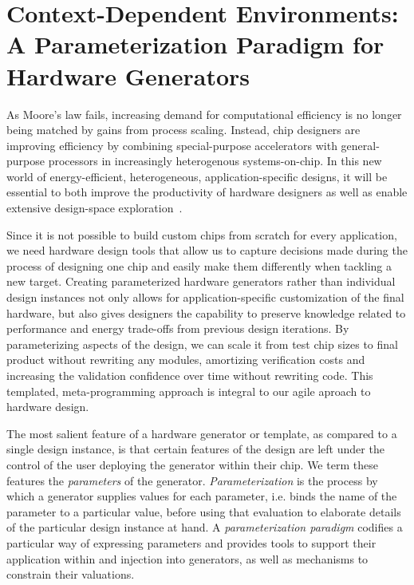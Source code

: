 \chapter{Context-Dependent Environments: \\ A Parameterization Paradigm for Hardware Generators}
\label{c.parameters}

As Moore's law fails, increasing demand for computational efficiency is no longer being matched by gains from process scaling. 
Instead, chip designers are improving efficiency by combining special-purpose accelerators with general-purpose processors in increasingly heterogenous systems-on-chip.
In this new world of energy-efficient, heterogeneous, application-specific designs, it will be essential to both improve the productivity of hardware designers as well as enable extensive design-space exploration~\cite{shacham-micro10}.

Since it is not possible to build custom chips from scratch for every application,
we need hardware design tools that allow us to capture decisions made
during the process of designing one chip and easily make them differently when tackling a new target.
Creating parameterized hardware generators rather than individual design instances not only allows for application-specific customization of the final hardware,
but also gives designers the capability to preserve knowledge related to performance and energy trade-offs from previous design iterations.
By parameterizing aspects of the design, we can scale it from test chip sizes to final product without rewriting any modules, amortizing verification costs and increasing the validation confidence over time without rewriting code.
This templated, meta-programming approach is integral to our agile aproach to hardware design.

The most salient feature of a hardware generator or template, as
compared to a single design instance, is that certain features of the design are
left under the control of the user deploying the generator within their chip.
We term these features the {\em parameters} of the generator.
{\em Parameterization} is the process by which a generator supplies values for each parameter,
i.e. binds the name of the parameter to a particular value,
before using that evaluation to elaborate details of the particular design instance at hand.
A {\em parameterization paradigm} codifies a particular way of expressing parameters and provides tools to support their application within and injection into generators,
as well as mechanisms to constrain their valuations.

